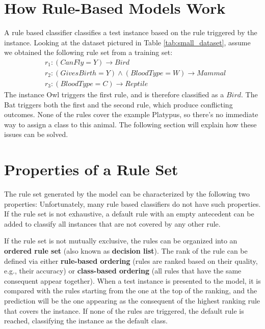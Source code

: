 \section{How Rule-Based Models Work}

A rule based classifier classifies a test instance based on the rule triggered by the instance. Looking at the dataset pictured in Table \ref{tab:small_dataset}, assume we obtained the following rule set from a training set:
\begin{align*}
    &r_1 : (Can Fly = Y) \xrightarrow{} Bird \\
    &r_2 : (Gives Birth = Y) \land (Blood Type = W) \xrightarrow{} Mammal \\
    &r_3 : (Blood Type = C) \xrightarrow{} Reptile
\end{align*}
The instance Owl triggers the first rule, and is therefore classified as a $Bird$. The Bat triggers both the first and the second rule, which produce conflicting outcomes. None of the rules cover the example Platypus, so there's no immediate way to assign a class to this animal. The following section will explain how these issues can be solved.

\section{Properties of a Rule Set}

The rule set generated by the model can be characterized by the following two properties:
Unfortunately, many rule based classifiers do not have such properties. If the rule set is not exhaustive, a default rule with an empty antecedent can be added to classify all instances that are not covered by any other rule.

If the rule set is not mutually exclusive, the rules can be organized into an \textbf{ordered rule set} (also known as \textbf{decision list}).
The rank of the rule can be defined via either \textbf{rule-based ordering} (rules are ranked based on their quality, e.g., their accuracy) or \textbf{class-based ordering} (all rules that have the same consequent appear together). When a test instance is presented to the model, it is compared with the rules starting from the one at the top of the ranking, and the prediction will be the one appearing as the consequent of the highest ranking rule that covers the instance. If none of the rules are triggered, the default rule is reached, classifying the instance as the default class.

